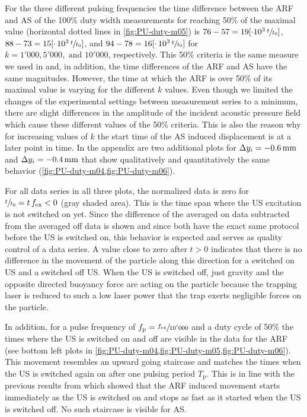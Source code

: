 For the three different pulsing frequencies the time difference between the ARF 
and AS of the 100\% duty width measurements for reaching 50\% of the maximal 
value (horizontal dotted lines in \cref{fig:PU-duty-m05}) is $76-57=19[\cdot 
10^{3}\,\sfrac{t}{t_{0}}]$, $88-73=15[\cdot\,10^{3}\,\sfrac{t}{t_{0}}]$, and 
$94-78=16[\cdot\,10^{3}\,\sfrac{t}{t_{0}}]$ for $k=1'000, 5'000,\text{ and } 
10'000$, respectively. This 50\% criteria is the same measure we used in 
\cite{Goering2021} and, in addition, the time differences of the ARF and AS 
have the same magnitudes. However, the time at which the ARF is over 50\% of 
its maximal value is varying for the different $k$ values. Even though we 
limited the changes of the experimental settings between measurement series to 
a minimum, there are slight differences in the amplitude of the incident 
acoustic pressure field which cause these different values of the 50\% 
criteria. This is also the reason why for increasing values of $k$  the start 
time of the AS induced displacement is at a later point in time. In the 
appendix are two additional plots for $\Dy_{i} = \SI{-0.6}{\mm}$ and $\Dy_{i}= 
\SI{-0.4}{\mm}$ that show qualitatively and quantitatively the same behavior 
(\cref{fig:PU-duty-m04,fig:PU-duty-m06}).

For all data series in all three plots, the normalized data is zero for 
$\sfrac{t}{t_{0}}=t\,f_{\mathrm{ex}}<0$ (gray shaded area). This is the time span where 
the US excitation is not switched on yet. Since the difference of the averaged 
on data subtracted from the averaged off data is shown and since both have the 
exact same protocol before the US is switched on, this behavior is expected and 
serves as quality control of a data series. A value close to zero after $t>0$ 
indicates that there is no difference in the movement of the particle along 
this direction for a switched on US and a switched off US. When the US is 
switched off, just gravity and the opposite directed buoyancy force are acting 
on the particle because the trapping laser is reduced to such a low laser power 
that the trap exerts negligible forces on the particle.

In addition, for a pulse frequency of $f_{\mathrm{p}}=\sfrac{f_{\mathrm{ex}}}{10'000}$ and a duty 
cycle of 50\% the times where the US is switched on and off are visible in the 
data for the ARF (see bottom left plots in
\cref{fig:PU-duty-m04,fig:PU-duty-m05,fig:PU-duty-m06}). This movement resembles an 
upward going staircase and matches the times when the US is switched again on 
after one pulsing period $T_{\mathrm{p}}$. This is in line with the previous 
results from \cite{Goering2021} which showed that the ARF induced movement 
starts immediately as the US is switched on and stops as fast as it started 
when the US is switched off. No such staircase is visible for AS.


